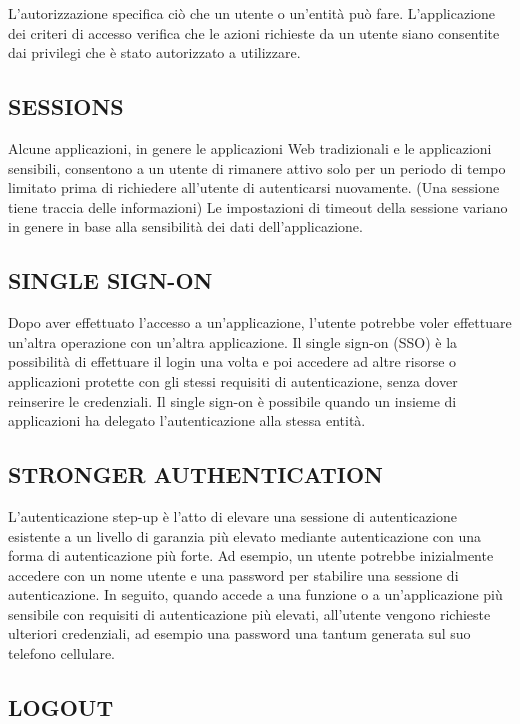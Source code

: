 L'autorizzazione specifica ciò che un utente o un'entità può fare. L'applicazione
dei criteri di accesso verifica che le azioni richieste da un utente siano
consentite dai privilegi che è stato autorizzato a utilizzare.

\subsection{SESSIONS}

Alcune applicazioni, in genere le applicazioni Web tradizionali e le applicazioni
sensibili, consentono a un utente di rimanere attivo solo per un periodo di tempo
limitato prima di richiedere all'utente di autenticarsi nuovamente.
(Una sessione tiene traccia delle informazioni)
Le impostazioni di timeout della sessione variano in genere in base alla
sensibilità dei dati dell'applicazione.

\subsection{SINGLE SIGN-ON}

Dopo aver effettuato l'accesso a un'applicazione, l'utente potrebbe voler
effettuare un'altra operazione con un'altra applicazione.
Il single sign-on (SSO) è la possibilità di effettuare il login una volta e poi
accedere ad altre risorse o applicazioni protette con gli stessi requisiti di
autenticazione, senza dover reinserire le credenziali.
Il single sign-on è possibile quando un insieme di applicazioni ha delegato
l'autenticazione alla stessa entità.

\subsection{STRONGER AUTHENTICATION}

L'autenticazione step-up è l'atto di elevare una sessione di autenticazione
esistente a un livello di garanzia più elevato mediante
autenticazione con una forma di autenticazione più forte.
Ad esempio, un utente potrebbe inizialmente accedere con un nome utente e una
password per stabilire una sessione di autenticazione.
In seguito, quando accede a una funzione o a un'applicazione più sensibile
con requisiti di autenticazione più elevati, all'utente vengono richieste
ulteriori credenziali, ad esempio una password una tantum generata sul suo
telefono cellulare.

\subsection{LOGOUT}

